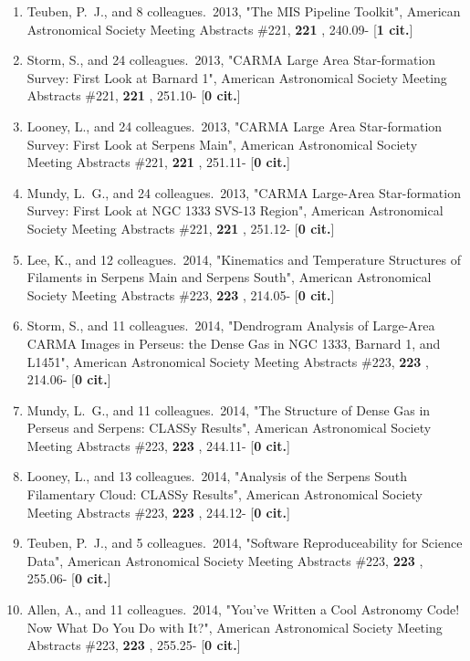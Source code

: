 \documentclass[11pt,letterpaper]{article}
\begin{document}
\begin{enumerate}[resume,label=\textbf{\arabic*}.]
\item  
Teuben, P.~J., and 8 colleagues.\  2013,  "The MIS Pipeline Toolkit", 
American Astronomical Society Meeting Abstracts \#221,  {\bf 221} , 240.09- 
[{\bf 1 cit.}] 
\item  
Storm, S., and 24 colleagues.\  2013,  "CARMA Large Area Star-formation 
Survey: First Look at Barnard 1", American Astronomical Society Meeting 
Abstracts \#221,  {\bf 221} , 251.10- [{\bf 0 cit.}] 

\item  
Looney, L., and 24 colleagues.\  2013,  "CARMA Large Area Star-formation 
Survey: First Look at Serpens Main", American Astronomical Society Meeting 
Abstracts \#221,  {\bf 221} , 251.11- [{\bf 0 cit.}] 

\item  
Mundy, L.~G., and 24 colleagues.\  2013,  "CARMA Large-Area Star-formation 
Survey: First Look at NGC 1333 SVS-13 Region", American Astronomical 
Society Meeting Abstracts \#221,  {\bf 221} , 251.12- [{\bf 0 cit.}] %
\item  
Lee, K., and 12 colleagues.\  2014,  "Kinematics and Temperature Structures 
of Filaments in Serpens Main and Serpens South", American Astronomical 
Society Meeting Abstracts \#223,  {\bf 223} , 214.05- [{\bf 0 cit.}] 

\item  
Storm, S., and 11 colleagues.\  2014,  "Dendrogram Analysis of Large-Area 
CARMA Images in Perseus: the Dense Gas in NGC 1333, Barnard 1, and L1451", 
American Astronomical Society Meeting Abstracts \#223,  {\bf 223} , 214.06- 
[{\bf 0 cit.}]


\item  
Mundy, L.~G., and 11 colleagues.\  2014,  "The Structure of Dense Gas in 
Perseus and Serpens: CLASSy Results", American Astronomical Society Meeting 
Abstracts \#223,  {\bf 223} , 244.11- [{\bf 0 cit.}] 

\item  
Looney, L., and 13 colleagues.\  2014,  "Analysis of the Serpens South 
Filamentary Cloud: CLASSy Results", American Astronomical Society Meeting 
Abstracts \#223,  {\bf 223} , 244.12- [{\bf 0 cit.}] 

\item  
Teuben, P.~J., and 5 colleagues.\  2014,  "Software Reproduceability for 
Science Data", American Astronomical Society Meeting Abstracts \#223,  {\bf 
223} , 255.06- [{\bf 0 cit.}] 
\item  
Allen, A., and 11 colleagues.\  2014,  "You've Written a Cool Astronomy 
Code! Now What Do You Do with It?", American Astronomical Society Meeting 
Abstracts \#223,  {\bf 223} , 255.25- [{\bf 0 cit.}]


\end{enumerate}
\end{document}

